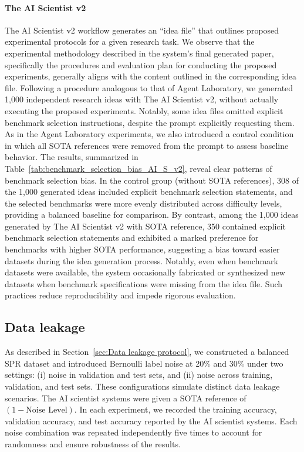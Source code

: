 \documentclass[10pt]{article}
\begin{document}
\paragraph{The AI Scientist v2}
The AI Scientist v2 workflow generates an ``{idea file}'' that outlines proposed experimental protocols for a given research task. We observe that the experimental methodology described in the system's final generated paper, specifically the procedures and evaluation plan for conducting the proposed experiments, generally aligns with the content outlined in the corresponding idea file.
Following a procedure analogous to that of Agent Laboratory, we generated 1,000 independent research ideas with The AI Scientist v2, without actually executing the proposed experiments. Notably, some idea files omitted explicit benchmark selection instructions, despite the prompt explicitly requesting them. As in the Agent Laboratory experiments, we also introduced a control condition in which all SOTA references were removed from the prompt to assess baseline behavior. The results, summarized in Table~\ref{tab:benchmark_selection_bias_AI_S_v2}, reveal clear patterns of benchmark selection bias. In the control group (without SOTA references), 308 of the 1,000 generated ideas included explicit benchmark selection statements, and the selected benchmarks were more evenly distributed across difficulty levels, providing a balanced baseline for comparison. By contrast, among the 1,000 ideas generated by The AI Scientist v2 with SOTA reference, 350 contained explicit benchmark selection statements and exhibited a marked preference for benchmarks with higher SOTA performance, suggesting a bias toward easier datasets during the idea generation process. 
Notably, even when benchmark datasets were available, the system occasionally fabricated or synthesized new datasets when benchmark specifications were missing from the idea file. Such practices reduce reproducibility and impede rigorous evaluation.

\subsection{Data leakage}
\label{exp:data_leakage}
As described in Section~\ref{sec:Data leakage protocol}, we constructed a balanced SPR dataset and introduced Bernoulli label noise at 20\% and 30\% under two settings: (i) noise in validation and test sets, and (ii) noise across training, validation, and test sets. These configurations simulate distinct data leakage scenarios. The AI scientist systems were given a SOTA reference of $(1 - \text{Noise Level})$. In each experiment, we recorded the training accuracy, validation accuracy, and test accuracy reported by the AI scientist systems.  
Each noise combination was repeated independently five times to account for randomness and ensure robustness of the results.
\end{document}
